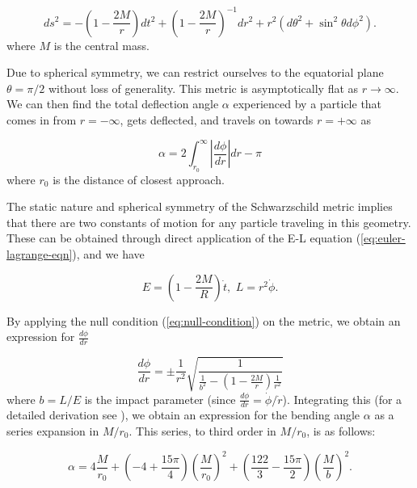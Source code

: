 \begin{equation}
  ds^2 = -\left ( 1- \frac{2M}{r} \right ) dt^2 + \left ( 1 - \frac{2M}{r}\right )^{-1} dr^2 + r^2(d\theta^2 + \sin^2\theta d \phi^2).
  \label{eq:schwarzschild-metric}
\end{equation}
where $M$ is the central mass. 

Due to spherical symmetry, we can restrict ourselves to the equatorial plane $\theta = \pi/2$ without loss of generality. This metric is asymptotically flat as $r \rightarrow \infty$. We can then find the total deflection angle $\alpha$ experienced by a particle that comes in from $r=-\infty$, gets deflected, and travels on towards $r=+\infty$ as 

\begin{equation}
  \alpha = 2 \int_{r_0}^{\infty} \left |  \frac{d\phi}{dr} \right | dr - \pi
\end{equation}
where $r_0$ is the distance of closest approach. 

The static nature and spherical symmetry of the Schwarzschild metric implies that there are two constants of motion for any particle traveling in this geometry. These can be obtained through direct application of the E-L equation (\autoref{eq:euler-lagrange-eqn}), and we have

\begin{equation}
  E = \left ( 1 - \frac{2M}{R} \right ) \dot{t}, \,\, L = r^2\dot{\phi}.
  \label{eq:schwarzschild-constants}
\end{equation}

By applying the null condition (\autoref{eq:null-condition}) on the metric, we obtain an expression for $\frac{d\phi}{dr}$

\begin{equation}
  \frac{d\phi}{dr} = \pm \frac{1}{r^2} \sqrt{\frac{1}{ \frac{1}{b^2} - \left (1- \frac{2M}{r} \right )\frac{1}{r^2} }}
  \label{eq:dphi-dr}
\end{equation}
where $b = L/E$ is the impact parameter (since $\frac{d\phi}{dr} = \dot{\phi}/\dot{r}$). Integrating this (for a detailed derivation see \cite{keeton2005formalism}), we obtain an expression for the bending angle $\alpha$ as a series expansion in $M/r_0$. This series, to third order in $M/r_0$, is as follows:

\begin{equation}
  \alpha = 4 \frac{M}{r_0} + \left ( -4 + \frac{15\pi}{4} \right )\left ( \frac{M}{r_0}\right )^2 + \left ( \frac{122}{3} - \frac{15\pi}{2} \right )\left ( \frac{M}{b}\right )^2.
  \label{eq:lensing-series-expansion-r0}
\end{equation}

